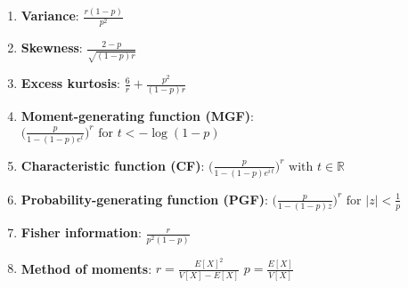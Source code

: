\begin{enumerate}
    \item \textbf{Variance}: 
    $ 
         {\displaystyle {\frac {r(1-p)}{p^{2}}}}
    $
    \hfill \cite{wiki/Negative_binomial_distribution}


    \item \textbf{Skewness}:
    $
         {\displaystyle {\frac {2-p}{\sqrt {(1-p)r}}}}
    $
    \hfill \cite{wiki/Negative_binomial_distribution}

    \item \textbf{Excess kurtosis}: 
    $
         {\displaystyle {\frac {6}{r}}+{\frac {p^{2}}{(1-p)r}}}
    $
    \hfill \cite{wiki/Negative_binomial_distribution}


    \item \textbf{Moment-generating function (MGF)}: 
    $
         {\displaystyle {\biggl (}{\frac {p}{1-(1-p)e^{t}}}{\biggr )}^{\!r}{\text{ for }}t<-\log(1-p)}
    $
    \hfill \cite{wiki/Negative_binomial_distribution}
    
    \item \textbf{Characteristic function (CF)}:
    $   
         {\displaystyle {\biggl (}{\frac {p}{1-(1-p)e^{i\,t}}}{\biggr )}^{\!r}{\text{ with }}t\in \mathbb {R} }
    $
    \hfill \cite{wiki/Negative_binomial_distribution}

    \item \textbf{Probability-generating function (PGF)}:
    $
         {\displaystyle {\biggl (}{\frac {p}{1-(1-p)z}}{\biggr )}^{\!r}{\text{ for }}|z|<{\frac {1}{p}}}
    $
    \hfill \cite{wiki/Negative_binomial_distribution}

    \item \textbf{Fisher information}:
    $
         {\displaystyle {\frac {r}{p^{2}(1-p)}}}
    $
    \hfill \cite{wiki/Negative_binomial_distribution}

    \item \textbf{Method of moments}:
    $ {\displaystyle r={\frac {E[X]^{2}}{V[X]-E[X]}}}$
    \hspace{1cm}
    $ {\displaystyle p={\frac {E[X]}{V[X]}}}$
    \hfill \cite{wiki/Negative_binomial_distribution}
\end{enumerate}







